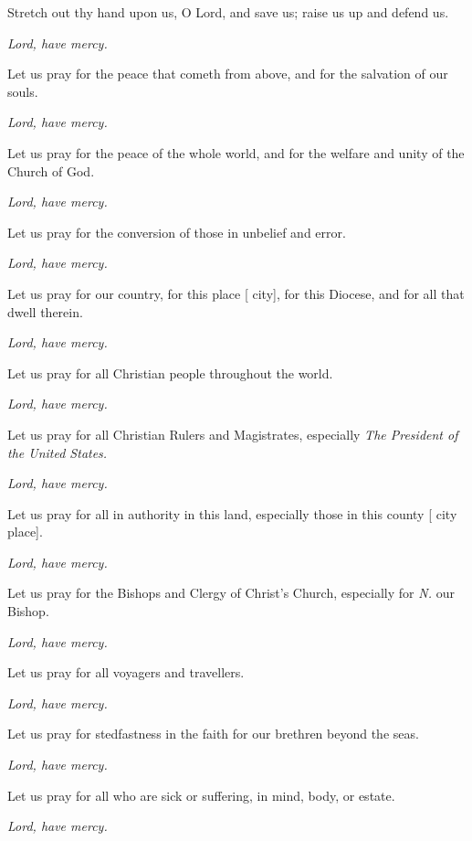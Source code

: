 \smallskip
Stretch out thy hand upon us, O Lord, and save us; raise us up and defend us.

\centerline{\emph{Lord, have mercy.}}

\smallskip
Let us pray for the peace that cometh from above, and for the salvation of our souls.

\centerline{\emph{Lord, have mercy.}}

\smallskip
Let us pray for the peace of the whole world, and for the welfare and unity of the Church of God.

\centerline{\emph{Lord, have mercy.}}

\smallskip
Let us pray for the conversion of those in unbelief and error.

\centerline{\emph{Lord, have mercy.}}

\smallskip
Let us pray for our country, for this place [ city], for this Diocese, and for all that dwell therein.

\centerline{\emph{Lord, have mercy.}}

\smallskip
Let us pray for all Christian people throughout the world.

\centerline{\emph{Lord, have mercy.}}

\smallskip
Let us pray for all %
Christian Rulers and Magistrates, especially \emph{The President of the United States.}

\centerline{\emph{Lord, have mercy.}}

\smallskip
Let us pray for all in authority in this land, especially those in this county [ city  place].

\centerline{\emph{Lord, have mercy.}}

\smallskip
Let us pray for the Bishops and Clergy of Christ's Church, especially for \emph{N.} our Bishop.

\centerline{\emph{Lord, have mercy.}}

\smallskip
Let us pray for all voyagers and travellers.

\centerline{\emph{Lord, have mercy.}}

\smallskip
Let us pray for stedfastness in the faith for our brethren beyond the seas.

\centerline{\emph{Lord, have mercy.}}

\smallskip
Let us pray for all who are sick or suffering, in mind, body, or estate.

\smallskip
\centerline{\emph{Lord, have mercy.}}

